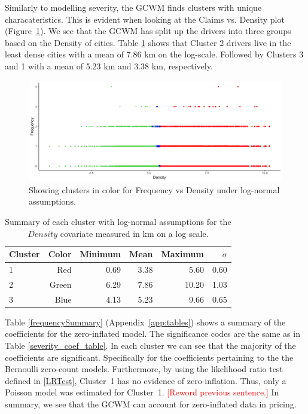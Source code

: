 \documentclass[11pt,letterpaper]{article}
\numberwithin{equation}{section}
\numberwithin{equation}{section}
\numberwithin{equation}{section}
\begin{document}
Similarly to modelling severity, the GCWM finds clusters with unique characateristics. This is evident when looking at the Claims vs. Density plot (Figure~\ref{frequencyGraph}). We see that the GCWM has split up the drivers into three groups based on the Density of cities. Table \ref{summarycovariates} shows that Cluster 2 drivers live in the least dense cities with a mean of 7.86 km on the log-scale. Followed by Clusters 3 and 1 with a mean of 5.23 km and 3.38 km, respectively.
\begin{figure}[!ht]
\begin{center}
\includegraphics[scale=0.47]{freqPlot.png}
\end{center}
\vspace{-0.2in}\caption{Showing clusters in color for Frequency vs Density under log-normal assumptions.}
\label{frequencyGraph}
\end{figure}
\begin{table}[!htb]
 \begin{center}
 \caption{Summary of each cluster with log-normal assumptions for the $Density$ covariate measured in km on a log scale.} \label{summarycovariates}
\begin{tabular}{lrrrrr}
\hline
Cluster  & Color & Minimum & Mean & Maximum & $\sigma$  \\
\hline
1 &   Red         & 0.69    & 3.38 & 5.60    & 0.60  \\
2 &  Green       & 6.29    & 7.86 & 10.20   & 1.03  \\
3 &  Blue        & 4.13    & 5.23 & 9.66    & 0.65 \\
\hline
\end{tabular}
\end{center}
\end{table}

Table \ref{frequencySummary} (Appendix~\ref{app:tables}) shows a summary of the coefficients for the zero-inflated model. The
significance codes are the same as in Table \ref{severity_coef_table}. In each cluster we can see that the majority of the coefficients are significant. Specifically for the coefficients pertaining to the the Bernoulli zero-count models.  Furthermore, by using the likelihood ratio test defined in \eqref{LRTest}, Cluster~1 has no evidence of zero-inflation. Thus, only a Poisson model was estimated for Cluster~1. \textcolor{red}{[Reword previous sentence.]} In summary, we see that the GCWM can account for zero-inflated data in pricing.
\end{document}
